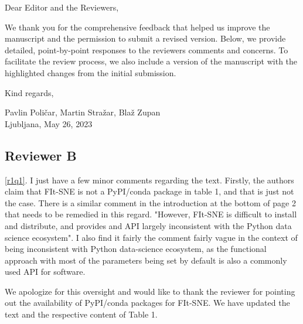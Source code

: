 \documentclass{article}
\newcounter{rtaskno}
\newcommand{\rtask}[1]{\refstepcounter{rtaskno}\label{#1}}
\newcommand{\reviewc}[2]{\begin{leftbar}\noindent\rtask{#1}\ref{#1}. #2\end{leftbar}}
\newcommand{\answer}[1]{\noindent #1\\[0mm]}
\newlength{\leftbarwidth}
\newlength{\leftbarsep}
\renewenvironment{leftbar}{%
    \def\FrameCommand{{\color{black}{\vrule width \leftbarwidth\relax\hspace {\leftbarsep}}}}%
    \MakeFramed {\advance \hsize -\width \FrameRestore }%
}{\endMakeFramed}
\begin{document}

\vspace{5mm}

\vspace{5mm}


\noindent Dear Editor and the Reviewers, \\
 
\vspace{3mm}

\noindent We thank you for the comprehensive feedback that helped us improve the manuscript and the permission to submit a revised version. Below, we provide detailed, point-by-point responses to the reviewers comments and concerns. To facilitate the review process, we also include a version of the manuscript with the highlighted changes from the initial submission.

\vspace{3mm}

\noindent Kind regards,
\vspace{3mm}

\noindent Pavlin Poli\v{c}ar, 
Martin Stra\v{z}ar, 
Bla\v{z} Zupan \\ 
\noindent Ljubljana, May 26, 2023

\vspace{10mm}


\subsection*{Reviewer B}

\reviewc{r1q1}{I just have a few minor comments regarding the text. Firstly, the authors claim that FIt-SNE is not a PyPI/conda package in table 1, and that is just not the case. There is a similar comment in the introduction at the bottom of page 2 that needs to be remedied in this regard. "However, FIt-SNE is difficult to install and distribute, and provides and API largely inconsistent with the Python data science ecosystem".  I also find it fairly the comment fairly vague in the context of being inconsistent with Python data-science ecosystem, as the functional approach with most of the parameters being set by default is also a commonly used API for software.}

\answer{
We apologize for this oversight and would like to thank the reviewer for pointing out the availability of PyPI/conda packages for FIt-SNE. We have updated the text and the respective content of Table 1.
}
\end{document}
